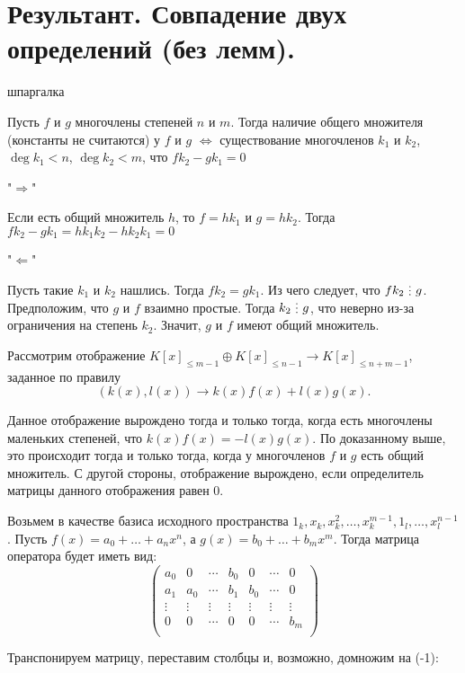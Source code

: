 \section{
 Результант. Совпадение двух определений (без лемм).
}

шпаргалка

Пусть $f$ и $g$ многочлены степеней $n$ и $m$. Тогда наличие общего множителя (константы не считаются) у $f$ и $g$
$\iff$ существование многочленов $k_1$ и $k_2$, $\deg k_1 <n $, $\deg k_2 < m$, что $f k_2 - g k_1 = 0$

\proof "$\Rightarrow$" 

Если есть общий множитель $h$, то $f = h k_1$ и $g = h k_2$. Тогда $f k_2 - g k_1 = h k_1 k_2 - h k_2 k_1 = 0$

"$\Leftarrow$"

Пусть такие $k_1$ и $k_2$ нашлись. Тогда $f k_2 = g k_1$. Из чего следует, что $f k_2 \di g$. Предположим, 
что $g$ и $f$ взаимно простые. Тогда $k_2 \di g$, что неверно из-за ограничения на степень $k_2$. Значит,
$g$ и $f$ имеют общий множитель.
\endproof


Рассмотрим отображение $K[x]_{\leq m-1}\oplus K[x]_{\leq n-1} \to K[x]_{\leq n+m-1}$, заданное по правилу
$$(k(x),l(x)) \to k(x)f(x)+l(x)g(x).$$ 

Данное отображение вырождено тогда и только тогда, когда есть многочлены маленьких степеней, что $k(x)f(x)=-l(x)g(x)$. 
По доказанному выше, это происходит тогда и только тогда, когда у многочленов $f$ и $g$ есть общий множитель. 
С другой стороны, отображение вырождено, если определитель матрицы данного отображения равен 0.

Возьмем в качестве базиса исходного пространства $1_k, x_k, x^2_k, \ldots, x^{m-1}_k, 1_l, \ldots, x^{n-1}_l$.
Пусть $f(x)=a_0+\dots+a_nx^n$, а $g(x)=b_0+\dots+b_mx^m$.
Тогда матрица оператора будет иметь вид:
$$\begin{pmatrix}
a_0     & 0     & \cdots    &  b_0  & 0     & \cdots    & 0 \\
a_1     & a_0   & \cdots    &  b_1  & b_0   & \cdots    & 0 \\
\vdots  &\vdots & \vdots    & \vdots & \vdots & \vdots  & \vdots \\
0       & 0     & \cdots    & 0     & 0     & \cdots    & b_m \\ 
\end{pmatrix}$$

Транспонируем матрицу, переставим столбцы и, возможно, домножим на (-1):
 
